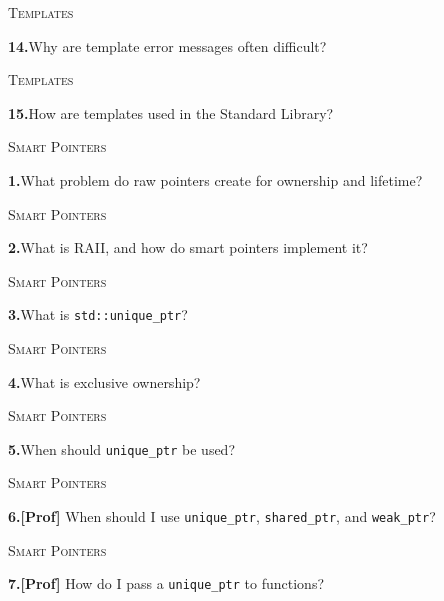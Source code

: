 \documentclass[11pt,a4paper]{article}
\newenvironment{questionblock}{%
  \begin{minipage}[t][0.455\textheight][t]{\textwidth}%
  \raggedright\small
}{%
  \vfill
  \end{minipage}%
}
\newcommand{\sectionlabel}[1]{\textsc{#1}\par\vspace{0.35em}}
\newcommand{\questionnumber}[1]{\textbf{#1.}\enspace}
\begin{document}
\begin{questionblock}
\sectionlabel{Templates}
\questionnumber{14}Why are template error messages often difficult?\par
\end{questionblock}
\newpage
\begin{questionblock}
\sectionlabel{Templates}
\questionnumber{15}How are templates used in the Standard Library?\par

\end{questionblock}
\vspace*{0.04\textheight}
\begin{questionblock}
\sectionlabel{Smart Pointers}
\questionnumber{1}What problem do raw pointers create for ownership and lifetime?\par
\end{questionblock}
\newpage
\begin{questionblock}
\sectionlabel{Smart Pointers}
\questionnumber{2}What is RAII, and how do smart pointers implement it?\par
\end{questionblock}
\vspace*{0.04\textheight}
\begin{questionblock}
\sectionlabel{Smart Pointers}
\questionnumber{3}What is \verb|std::unique_ptr|?\par
\end{questionblock}
\newpage
\begin{questionblock}
\sectionlabel{Smart Pointers}
\questionnumber{4}What is exclusive ownership?\par
\end{questionblock}
\vspace*{0.04\textheight}
\begin{questionblock}
\sectionlabel{Smart Pointers}
\questionnumber{5}When should \verb|unique_ptr| be used?\par
\end{questionblock}
\newpage
\begin{questionblock}
\sectionlabel{Smart Pointers}
\questionnumber{6}\textbf{[Prof]} When should I use \verb|unique_ptr|, \verb|shared_ptr|, and \verb|weak_ptr|?\par
\end{questionblock}
\vspace*{0.04\textheight}
\begin{questionblock}
\sectionlabel{Smart Pointers}
\questionnumber{7}\textbf{[Prof]} How do I pass a \verb|unique_ptr| to functions?\par
\end{questionblock}
\end{document}
